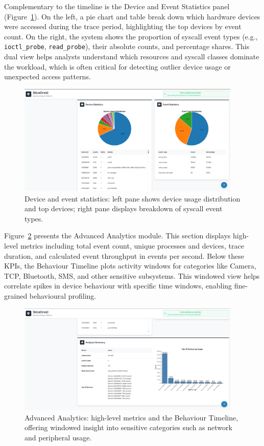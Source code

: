 \documentclass[a4paper,12pt]{report}
\begin{document}
Complementary to the timeline is the Device and Event Statistics panel (Figure~\ref{fig:device_event_statistics}). On the left, a pie chart and table break down which hardware devices were accessed during the trace period, highlighting the top devices by event count. On the right, the system shows the proportion of syscall event types (e.g., \texttt{ioctl\_probe}, \texttt{read\_probe}), their absolute counts, and percentage shares. This dual view helps analysts understand which resources and syscall classes dominate the workload, which is often critical for detecting outlier device usage or unexpected access patterns.

\begin{figure}[H]
\centering
\includegraphics[width=0.95\textwidth]{device_event_statistics.png}
\caption{Device and event statistics: left pane shows device usage distribution and top devices; right pane displays breakdown of syscall event types.}
\label{fig:device_event_statistics}
\end{figure}

Figure~\ref{fig:analytics_panel} presents the Advanced Analytics module. This section displays high-level metrics including total event count, unique processes and devices, trace duration, and calculated event throughput in events per second. Below these KPIs, the Behaviour Timeline plots activity windows for categories like Camera, TCP, Bluetooth, SMS, and other sensitive subsystems. This windowed view helps correlate spikes in device behaviour with specific time windows, enabling fine-grained behavioural profiling.

\begin{figure}[H]
\centering
\includegraphics[width=0.95\textwidth]{analytics_panel.png}
\caption{Advanced Analytics: high-level metrics and the Behaviour Timeline, offering windowed insight into sensitive categories such as network and peripheral usage.}
\label{fig:analytics_panel}
\end{figure}
\end{document}
